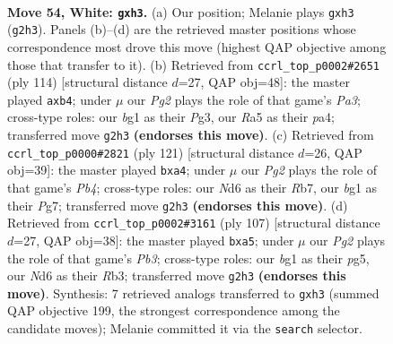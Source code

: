 \documentclass[11pt]{article}
\begin{document}
\clearpage

\begin{figure}[p]\centering
\begin{subfigure}{0.46\textwidth}\centering
\resizebox{\linewidth}{!}{%
\newchessgame
\chessboard[
  setfen={3k4/7r/3Nn3/R5P1/P7/7p/6P1/4K1b1 w - - 0 54},
  showmover=false,
  pgfstyle=straightmove, color=movearrow, markmove={g2-h3}
]}
\caption{}
\end{subfigure}\hfill
\begin{subfigure}{0.46\textwidth}\centering
\resizebox{\linewidth}{!}{%
\newchessgame
\chessboard[
  setfen={1r6/5p2/8/5R1P/pp6/P2k2P1/6K1/8 w - - 0 58},
  showmover=false,
  pgfstyle=straightmove, color=movearrow, markmove={a3-b4}
]}
\caption{}
\end{subfigure}
\\[4pt]
\begin{subfigure}{0.46\textwidth}\centering
\resizebox{\linewidth}{!}{%
\newchessgame
\chessboard[
  setfen={R7/1r4p1/4k3/1p6/P7/2P5/7K/8 b - - 0 61},
  showmover=false,
  pgfstyle=straightmove, color=movearrow, markmove={b5-a4}
]}
\caption{}
\end{subfigure}\hfill
\begin{subfigure}{0.46\textwidth}\centering
\resizebox{\linewidth}{!}{%
\newchessgame
\chessboard[
  setfen={8/2K3k1/1p6/P5P1/8/1rp5/8/R7 b - - 0 54},
  showmover=false,
  pgfstyle=straightmove, color=movearrow, markmove={b6-a5}
]}
\caption{}
\end{subfigure}
\caption{\textbf{Move 54, White: \texttt{gxh3}.} (a) Our position; Melanie plays \texttt{gxh3} (\texttt{g2h3}). Panels (b)--(d) are the retrieved master positions whose correspondence most drove this move (highest QAP objective among those that transfer to it). (b) Retrieved from \texttt{ccrl\_top\_p0002\#2651} (ply 114) [structural distance $d$=27, QAP obj=48]: the master played \texttt{axb4}; under $\mu$ our \emph{Pg2} plays the role of that game's \emph{Pa3}; cross-type roles: our \emph{b}g1 as their \emph{P}g3, our \emph{R}a5 as their \emph{p}a4; transferred move \texttt{g2h3} \textbf{(endorses this move)}. (c) Retrieved from \texttt{ccrl\_top\_p0000\#2821} (ply 121) [structural distance $d$=26, QAP obj=39]: the master played \texttt{bxa4}; under $\mu$ our \emph{Pg2} plays the role of that game's \emph{Pb4}; cross-type roles: our \emph{N}d6 as their \emph{R}b7, our \emph{b}g1 as their \emph{P}g7; transferred move \texttt{g2h3} \textbf{(endorses this move)}. (d) Retrieved from \texttt{ccrl\_top\_p0002\#3161} (ply 107) [structural distance $d$=27, QAP obj=38]: the master played \texttt{bxa5}; under $\mu$ our \emph{Pg2} plays the role of that game's \emph{Pb3}; cross-type roles: our \emph{b}g1 as their \emph{p}g5, our \emph{N}d6 as their \emph{R}b3; transferred move \texttt{g2h3} \textbf{(endorses this move)}. Synthesis: 7 retrieved analogs transferred to \texttt{gxh3} (summed QAP objective 199, the strongest correspondence among the candidate moves); Melanie committed it via the \texttt{search} selector.}
\label{fig:thought-m106}
\end{figure}
\end{document}
